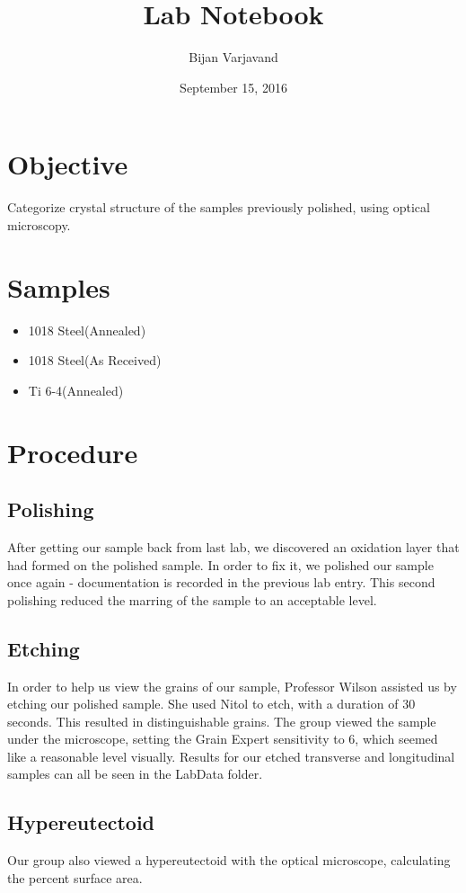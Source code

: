 \documentclass{article}
\author{Bijan Varjavand}
\title{Lab Notebook}
\date{September 15, 2016}
\begin{document}
\maketitle

\section{Objective}
Categorize crystal structure of the samples previously polished, using optical microscopy.

\section{Samples}
\begin{itemize}
 \item 1018 Steel(Annealed)
 \item 1018 Steel(As Received)
 \item Ti 6-4(Annealed)
\end{itemize}

\section{Procedure}

\subsection{Polishing}
After getting our sample back from last lab, we discovered an oxidation layer that had formed on the polished sample. In order to fix it, we polished our sample once again - documentation is recorded in the previous lab entry. This second polishing reduced the marring of the sample to an acceptable level.

\subsection{Etching}
In order to help us view the grains of our sample, Professor Wilson assisted us by etching our polished sample. She used Nitol to etch, with a duration of 30 seconds. This resulted in distinguishable grains. The group viewed the sample under the microscope, setting the Grain Expert sensitivity to 6, which seemed like a reasonable level visually. Results for our etched transverse and longitudinal samples can all be seen in the LabData folder.

\subsection{Hypereutectoid}
Our group also viewed a hypereutectoid with the optical microscope, calculating the percent surface area.
\end{document}
